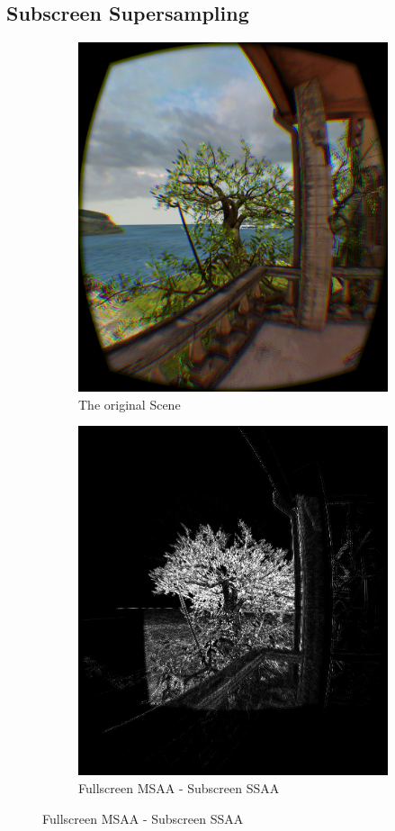 \documentclass[12pt,a4paper,twoside,openright]{report}
\begin{document}
\subsection{Subscreen Supersampling}

\begin{figure}
\begin{subfigure}{0.5\textwidth}
\includegraphics[width=0.9\linewidth]{figs/tree_msaa.png}
\caption{The original Scene}
\label{fig:subim2}
\end{subfigure}
\begin{subfigure}{0.5\textwidth}
\centerline{\includegraphics[width=0.9\linewidth]{figs/difftree.png}}
\caption{Fullscreen MSAA - Subscreen SSAA}
\label{ssaatree}
\end{subfigure}
 

\end{figure}
\end{document}
